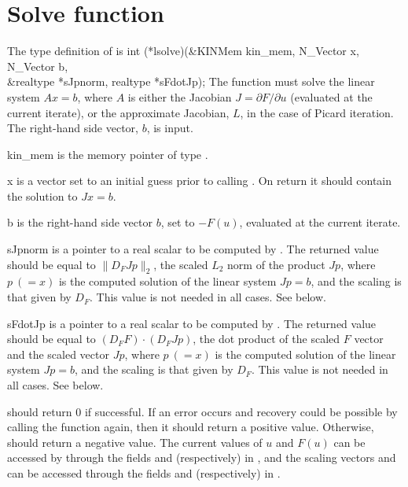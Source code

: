 \section{Solve function}
The type definition of  is
{
  int (*lsolve)(&KINMem kin\_mem, N\_Vector x, N\_Vector b, \\
                &realtype *sJpnorm, realtype *sFdotJp);
}
{
  The  function must solve the linear system $A x = b$, where $A$ is
  either the Jacobian $J = \partial F / \partial u$ (evaluated at the current
  iterate), or the approximate Jacobian, $L$, in the case of Picard iteration.
  The right-hand side vector, $b$, is input. 
}
{
  \begin{args}[N\_Vector]
  \item[kin\_mem]
    is the {\kinsol} memory pointer of type .
  \item[x]
    is a vector set to an initial guess prior to calling . 
    On return it should contain the solution to $J x = b$.
  \item[b]
    is the right-hand side vector $b$, set to $-F(u)$, evaluated at
    the current iterate.
  \item[sJpnorm]
    is a pointer to a real scalar to be computed by .  The returned
    value  should be equal to $\|D_F Jp\|_2$, the scaled $L_2$
    norm of the product $Jp$, where $p~(= x)$ is the computed solution of the
    linear system $J p = b$, and the scaling is that given by $D_F$.  
    This value is not needed in all cases.  See below.
  \item[sFdotJp]
    is a pointer to a real scalar to be computed by .  The returned
    value   should be equal to $(D_F F)\cdot(D_F Jp)$, the
    dot product of the scaled $F$ vector and the scaled vector $J p$, where
    $p~(= x)$ is the computed solution of the linear system $J p = b$,
    and the scaling is that given by $D_F$.
    This value is not needed in all cases.  See below.
  \end{args}
}
{
   should return $0$ if successful.
  If an error occurs and recovery could be possible by calling the
   function again, then it should return a positive value.
  Otherwise,  should return a negative value.
}
{
  The current values of $u$ and $F(u)$ can be accessed by  through
  the fields  and  (respectively) in ,
  and the scaling vectors  and  can be accessed
  through the fields  and  (respectively)
   in .
}


